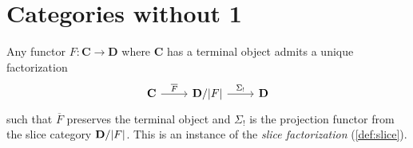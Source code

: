 \documentclass[11pt, oneside, article]{memoir}
\makeatletter
\theoremstyle{plain}
\theoremstyle{definition}
\theoremstyle{remark}
\def\theHsection{\theHchapter.\arabic{section}}
\def\theHtheorem{\theHsection.\arabic{theorem}}
\def\theHcorollary{\theHsection.\arabic{theorem}}
\def\theHproposition{\theHsection.\arabic{theorem}}
\def\theHlemma{\theHsection.\arabic{theorem}}
\def\theHconjecture{\theHsection.\arabic{theorem}}
\def\theHdefinition{\theHsection.\arabic{theorem}}
\def\theHmyremark{\theHsection.\arabic{theorem}}
\def\theHmyexample{\theHsection.\arabic{theorem}}
\def\theHmyconvention{\theHsection.\arabic{theorem}}
\def\theHmywarning{\theHsection.\arabic{theorem}}
\def\theHmycounterexample{\theHsection.\arabic{theorem}}
\def\theHdef{\theHsection.\arabic{theorem}}
\def\theHrem{\theHsection.\arabic{theorem}}
\let\@origchapter\chapter
\renewcommand{\thechapter}{\arabic{chapter}}
\newif\if@inappendixmode
\newcommand{\@syncthmdisplay}{%
  \global\let\thedef\thetheorem
  \global\let\therem\thetheorem
  \global\let\thedefinition\thetheorem
  \global\let\thelemma\thetheorem
  \global\let\thecorollary\thetheorem
  \global\let\theproposition\thetheorem
  \global\let\theconjecture\thetheorem
  \global\let\themyremark\thetheorem
  \global\let\themyexample\thetheorem
  \global\let\themyconvention\thetheorem
  \global\let\themywarning\thetheorem
  \global\let\themycounterexample\thetheorem
}
\newcommand{\@syncthmH}[1]{%
  \gdef\theHtheorem{#1}\gdef\theHcorollary{#1}\gdef\theHproposition{#1}%
  \gdef\theHlemma{#1}\gdef\theHconjecture{#1}\gdef\theHdefinition{#1}%
  \gdef\theHmyremark{#1}\gdef\theHmyexample{#1}\gdef\theHmyconvention{#1}%
  \gdef\theHmywarning{#1}\gdef\theHmycounterexample{#1}%
  \gdef\theHdef{#1}\gdef\theHrem{#1}%
}
\renewcommand{\chapter}{%
  \if@inappendixmode%
    \renewcommand{\thechapter}{\Alph{chapter}}%
    \renewcommand{\theHchapter}{\Alph{chapter}}%
    \counterwithout*{theorem}{section}%
    \gdef\thetheorem{\thechapter.\arabic{theorem}}%
    \@syncthmdisplay
    \@syncthmH{\theHchapter.\arabic{theorem}}%
  \else
    \renewcommand{\thechapter}{\arabic{chapter}}%
    \renewcommand{\theHchapter}{\arabic{chapter}}%
  \fi
  \@origchapter
}
\DeclarePairedDelimiter{\abs}{\lvert}{\rvert}
\newcommand{\bang}{\mathrm{!}}
\newcommand{\namedcat}[1]{\mathbf{#1}}
\newcommand{\cat}[1]{\mathbf{#1}}
\newcommand{\Set}{\namedcat{Set}}
\newcommand{\Cmd}{\mathbb{C}\namedcat{md}}
\newcommand{\CmdId}{\Cmd_=}
\newcommand{\Con}{\namedcat{Cmd}^\natural}
\newcommand{\ConSet}{\Con}
\newcommand{\pts}[1]{{\abs{#1}}}
\newcommand{\ptlift}[1]{\overline{#1}}
\newcommand{\reindex}[1]{\Delta_{#1}}
\newcommand{\slicel}{\Sigma_\bang}
\newcommand{\xX}{X}
\newcommand{\bC}{\cat{C}}
\newcommand{\bD}{\cat{D}}
\makeatother
\begin{document}



\chapter{Categories without 1}\label{app:comprehensive}
\appendixtocspace

Any functor $F \colon \bC \to \bD$ where $\bC$ has a terminal object
admits a unique factorization
\[\begin{tikzcd}
    \bC & {\bD/\pts{F}} & \bD \arrow["{\ptlift{F}}", from=1-1,
    to=1-2] \arrow["{\slicel}", from=1-2, to=1-3]
  \end{tikzcd}\] such that $\ptlift{F}$ preserves the terminal object
and $\slicel$ is the projection functor from the slice category
$\bD/\pts{F}$. This is an instance of the \emph{slice factorization}
(\cref{def:slice}).
\end{document}
